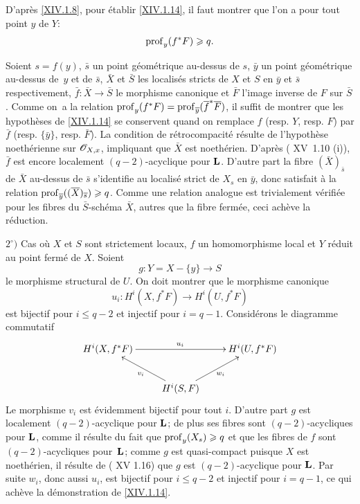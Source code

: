 D'apr\`es \ref{XIV.1.8}, pour \'etablir \ref{XIV.1.14}, il faut montrer que l'on a pour tout point $y$ de $Y$:$$
\operatorname{prof}_y(f^*F)\geqslant q.
$$

Soient $s=f(y)$, $\bar s$ un point g\'eom\'etrique au-dessus de $s$, $\bar y$ un point g\'eom\'etrique au-dessus de~$y$ et de $\bar s$, $\bar X$ et $\bar S$ les localis\'es stricts de $X$ et $S$ en $\bar y$ et $\bar s$ respectivement, $\bar f:\bar X\to\bar S$ le morphisme canonique et $\bar F$ l'image inverse de $F$ sur $\bar S$. Comme on~a la relation $\operatorname{prof}_y(f^*F)=\operatorname{prof}_{\overline y}(\overline f^*\overline F)$, il suffit de montrer que les hypoth\`eses de \ref{XIV.1.14} se conservent quand on remplace $f$ (resp. $Y$, resp. $F$) par $\bar f$ (resp. $\{\bar y\}$, resp. $\bar F$). La condition de r\'etrocompacit\'e r\'esulte de l'hypoth\`ese noeth\'erienne sur ${\mathscr O}_{X, x}$, impliquant que $\bar X$ est noeth\'erien. D'apr\`es ( XV~1.10 \textup{(i)}), $\bar f$ est encore localement $(q-2)$-acyclique pour $\mathbf{L}$. D'autre part la fibre $(\bar X)_{\bar s}$ de $\bar X$ au-dessus de $\bar s$ s'identifie au localis\'e strict de $X_s$ en $\bar y$, donc satisfait \`a la relation $\operatorname{prof}_{\overline y}((\overline X)_{\overline s})\geqslant q$. Comme une relation analogue est trivialement v\'erifi\'ee pour les fibres du $\bar S$-sch\'ema $\bar X$, autres que la fibre ferm\'ee, ceci ach\`eve la r\'eduction.

$2^\circ)$ Cas o\`u $X$ et $S$ sont strictement locaux, $f$ un homomorphisme local et $Y$ r\'eduit au point ferm\'e de $X$. Soient
$$g:Y=X-\{y\}\to S$$
le morphisme structural de $U$. On doit montrer que le morphisme canonique
$$u_i:H^i(X, f^*F)\to H^i(U, f^*F)$$
est bijectif pour $i\leq q-2$ et injectif pour $i=q-1$. Consid\'erons le diagramme commutatif
$$
\xymatrix{H^i(X, f^*F)\ar[rr]^{u_i}&& H^i(U, f^*F)\\&H^i(S, F)\ar[lu]^{v_i}\ar[ru]_{w_i}}$$
Le morphisme $v_i$ est \'evidemment bijectif pour tout $i$. D'autre part $g$ est localement $(q-2)$-acyclique pour $\mathbf{L}$; de plus ses fibres sont $(q-2)$-acycliques pour $\mathbf{L}$, comme il r\'esulte du fait que $\operatorname{prof}_y(X_s)\geqslant q$ et que les fibres de $f$ sont $(q-2)$-acycliques pour~$\mathbf{L}$; comme $g$ est quasi-compact puisque $X$ est noeth\'erien, il r\'esulte de ( XV 1.16) que $g$ est $(q-2)$-acyclique pour $\mathbf{L}$. Par suite $w_i$, donc aussi $u_i$, est bijectif pour $i\leq q-2$ et injectif pour $i=q-1$, ce qui ach\`eve la d\'emonstration de \ref{XIV.1.14}.

